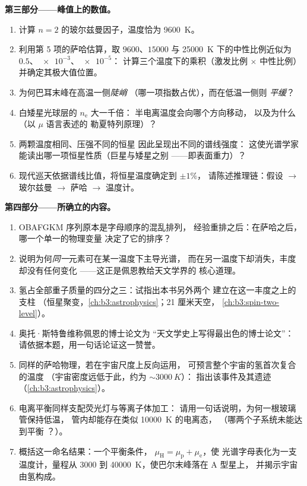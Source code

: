 \begin{problem}
\medskip\noindent\textbf{第三部分——峰值上的数值。}
\begin{enumerate}[resume]
  \item 计算 $n = 2$ 的玻尔兹曼因子，温度恰为
        \qty{9600}{K}。
  \item 利用第 5 项的萨哈估算，取
        $9600$、$15000$ 与 \qty{25000}{K} 下的中性比例近似为
        $0.5$、$\num{e-3}$、$\num{e-5}$：
        计算三个温度下的乘积（激发比例 $\times$ 中性比例）
        并确定其极大值位置。
  \item 为何巴耳末峰在高温一侧\emph{陡峭}
        （哪一项指数占优），而在低温一侧则
        \emph{平缓}？
  \item 白矮星光球层的 $n_{\text{e}}$ 大一千倍：
        半电离温度会向哪个方向移动，
        以及为什么（以 $\mu$ 语言表述的
        勒夏特列原理）？
  \item 两颗温度相同、压强不同的恒星
        因此呈现出不同的谱线强度：
        这使光谱学家能读出哪一项恒星性质（巨星与矮星之别
——即表面重力）？
  \item 现代巡天依据谱线比值，将恒星温度确定到 $\pm1\%$，
        请陈述推理链：假设 $\to$ 玻尔兹曼
        $\to$ 萨哈 $\to$ 温度计。
\end{enumerate}

\medskip\noindent\textbf{第四部分——所确立的内容。}
\begin{enumerate}[resume]
  \item OBAFGKM 序列原本是字母顺序的混乱排列，
        经验重排之后：在萨哈之后，哪一个单一的物理变量
        决定了它的排序？
  \item 说明为何\emph{同一}元素可在某一温度下主导光谱，
        而在另一温度下却消失，丰度却没有任何变化
——这正是佩恩教给天文学界的
        核心道理。
  \item 氢占全部重子质量的四分之三：试指出本书另外两个
        建立在这一丰度之上的支柱
        （恒星聚变，\cref{ch:b3:astrophysics}；21 厘米天空，
        \cref{ch:b3:spin-two-level}）。
  \item 奥托·斯特鲁维称佩恩的博士论文为
        “天文学史上写得最出色的博士论文”：
        请依据本题，用一句话论证这一赞誉。
  \item 同样的萨哈物理，若在宇宙尺度上反向运用，
        可预言整个宇宙的氢首次复合的温度
        （宇宙密度远低于此，约为 $\sim\qty{3000}{K}$）：
        指出该事件及其遗迹
        （\cref{ch:b3:astrophysics}）。
  \item 电离平衡同样支配荧光灯与等离子体加工：
        请用一句话说明，为何一根玻璃管保持低温，
        管内却能存在类似 \qty{10000}{K} 的电离态，
        （哪两个子系统未能达到平衡
        ？）。
  \item 概括这一命名结果：一个平衡条件，
        $\mu_{\text{H}} = \mu_{\text{p}} + \mu_{\text{e}}$，使
        光谱字母表化为一支温度计，量程从
        $3000$ 到 \qty{40000}{K}，使巴尔末峰落在 A 型星上，
        并揭示宇宙由氢构成。
\end{enumerate}
\end{problem}
